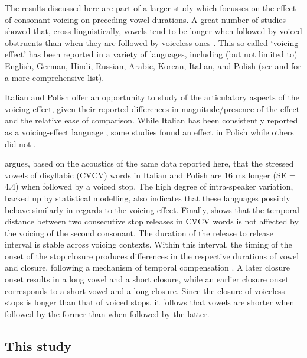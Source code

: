 \documentclass[12pt,]{article}
\begin{document}
The results discussed here are part of a larger study which focusses on
the effect of consonant voicing on preceding vowel durations. A great
number of studies showed that, cross-linguistically, vowels tend to be
longer when followed by voiced obstruents than when they are followed by
voiceless ones
\citep{house1953, peterson1960, chen1970, klatt1973, lisker1974, farnetani1986, fowler1992, hussein1994, esposito2002, lampp2004, durvasula2012}.
This so-called `voicing effect' has been reported in a variety of
languages, including (but not limited to) English, German, Hindi,
Russian, Arabic, Korean, Italian, and Polish (see
\citealt{maddieson1976} and \citealt{begus2017} for a more comprehensive
list).

Italian and Polish offer an opportunity to study of the articulatory
aspects of the voicing effect, given their reported differences in
magnitude/presence of the effect and the relative ease of comparison.
While Italian has been consistently reported as a voicing-effect
language \citep{caldognetto1979, farnetani1986, esposito2002}, some
studies found an effect in Polish
\citep{slowiaczek1985, nowak2006, malisz2008, coretta2018j} while others
did not \citep{keating1984, jassem1989}.

\citet{coretta2018j} argues, based on the acoustics of the same data
reported here, that the stressed vowels of disyllabic (CV́CV) words in
Italian and Polish are 16 ms longer (SE = 4.4) when followed by a voiced
stop. The high degree of intra-speaker variation, backed up by
statistical modelling, also indicates that these languages possibly
behave similarly in regards to the voicing effect. Finally,
\citet{coretta2018j} shows that the temporal distance between two
consecutive stop releases in CV́CV words is not affected by the voicing
of the second consonant. The duration of the release to release interval
is stable across voicing contexts. Within this interval, the timing of
the onset of the stop closure produces differences in the respective
durations of vowel and closure, following a mechanism of temporal
compensation
\citep{lindblom1967, slis1969a, slis1969, lehiste1970, lehiste1970a}. A
later closure onset results in a long vowel and a short closure, while
an earlier closure onset corresponds to a short vowel and a long
closure. Since the closure of voiceless stops is longer than that of
voiced stops, it follows that vowels are shorter when followed by the
former than when followed by the latter.

\hypertarget{this-study}{%
\subsection{This study}\label{this-study}}
\end{document}
